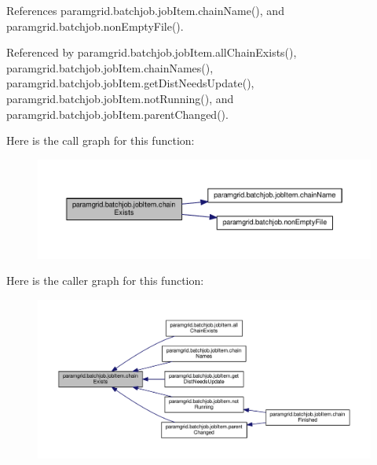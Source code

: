 References paramgrid.\+batchjob.\+job\+Item.\+chain\+Name(), and paramgrid.\+batchjob.\+non\+Empty\+File().



Referenced by paramgrid.\+batchjob.\+job\+Item.\+all\+Chain\+Exists(), paramgrid.\+batchjob.\+job\+Item.\+chain\+Names(), paramgrid.\+batchjob.\+job\+Item.\+get\+Dist\+Needs\+Update(), paramgrid.\+batchjob.\+job\+Item.\+not\+Running(), and paramgrid.\+batchjob.\+job\+Item.\+parent\+Changed().

Here is the call graph for this function\+:
\nopagebreak
\begin{figure}[H]
\begin{center}
\leavevmode
\includegraphics[width=350pt]{classparamgrid_1_1batchjob_1_1jobItem_af221a166a73199e5228a24546e014f87_cgraph}
\end{center}
\end{figure}
Here is the caller graph for this function\+:
\nopagebreak
\begin{figure}[H]
\begin{center}
\leavevmode
\includegraphics[width=350pt]{classparamgrid_1_1batchjob_1_1jobItem_af221a166a73199e5228a24546e014f87_icgraph}
\end{center}
\end{figure}
\mbox{\label{classparamgrid_1_1batchjob_1_1jobItem_a6c477e458924df69f4d638a39e37a56c}} 
